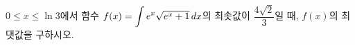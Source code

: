 \hspace*{2mm}\begin{minipage}[t]{\dimexpr\linewidth-2mm\relax}\vspace{0pt}
$0\le x\le\ln 3$에서 함수 $f(x)=\displaystyle\int e^x\sqrt{e^x+1}\mkern3mu dx$의 최솟값이 $\dfrac{4\sqrt{2}}{3}$일 때, $f(x)$의 최댓값을 구하시오.\end{minipage}

